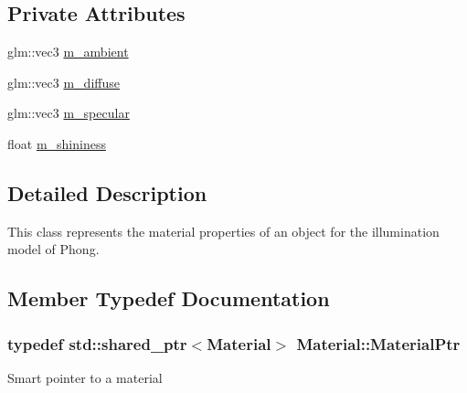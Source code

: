\subsection*{Private Attributes}
\begin{DoxyCompactItemize}
\item 
glm\+::vec3 \hyperlink{classMaterial_ab3b04455ca3a29eea275fe5dd6f70b9b}{m\+\_\+ambient}
\item 
glm\+::vec3 \hyperlink{classMaterial_a4655998d1721cb070f1e4f92d0dbc239}{m\+\_\+diffuse}
\item 
glm\+::vec3 \hyperlink{classMaterial_a472d9632e7e9db1e9d6db0e5a40a4cc3}{m\+\_\+specular}
\item 
float \hyperlink{classMaterial_ac6870095f155d023adb9fa1d02f9be4c}{m\+\_\+shininess}
\end{DoxyCompactItemize}


\subsection{Detailed Description}
This class represents the material properties of an object for the illumination model of Phong. 

\subsection{Member Typedef Documentation}
\hypertarget{classMaterial_afa8bf8c90cac7c65ba73bffc15f617c9}{
\subsubsection[{Material\+Ptr}]{\setlength{\rightskip}{0pt plus 5cm}typedef std\+::shared\+\_\+ptr$<${\bf Material}$>$ {\bf Material\+::\+Material\+Ptr}}}\label{classMaterial_afa8bf8c90cac7c65ba73bffc15f617c9}
Smart pointer to a material 

